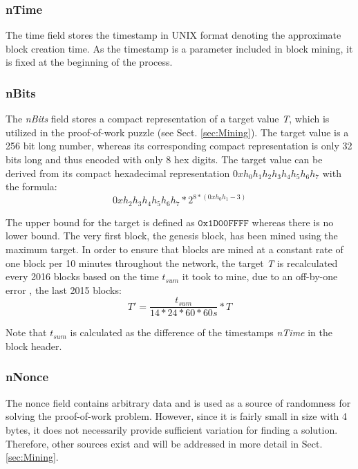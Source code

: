 \subsubsection*{nTime}
The time field stores the timestamp in UNIX format denoting the approximate block creation time. As the timestamp is a parameter included in block mining, it is fixed at the beginning of the process.


\subsubsection*{nBits}
The \textit{nBits} field stores a compact representation of a target value \emph{T}, which is utilized in the proof-of-work puzzle (see Sect. \ref{sec:Mining}). The target value is a 256 bit long number, whereas its corresponding compact representation is only 32 bits long and thus encoded with only 8 hex digits. The target value can be derived from its compact hexadecimal representation $\mathit{0xh_{0}h_{1}h_{2}h_{3}h_{4}h_{5}h_{6}h_{7}}$ with the formula:
\begin{equation}
0xh_{2}h_{3}h_{4}h_{5}h_{6}h_{7} * 2^{8*(0xh_{0}h_{1} - 3)}
\end{equation}


\noindent
The upper bound for the target is defined as $\texttt{0x1D00FFFF}$ whereas there is no lower bound. The very first block, the genesis block, has been mined using the maximum target. In order to ensure that blocks are mined at a constant rate of one block per 10 minutes throughout the network, the target \emph{T} is recalculated every 2016 blocks based on the time $\mathit{t_{sum}}$ it took to mine, due to an off-by-one error \cite{nBitsCalc}, the last 2015 blocks:
\begin{equation}
T' = \dfrac{t_{sum}}{14*24*60*60s}*T
\end{equation}

\noindent
Note that $\mathit{t_{sum}}$ is calculated as the difference of the timestamps \textit{nTime} in the block header.

\subsubsection*{nNonce}
The nonce field contains arbitrary data and is used as a source of randomness for solving the proof-of-work problem. However, since it is fairly small in size with 4 bytes, it does not necessarily provide sufficient variation for finding a solution. Therefore, other sources exist and will be addressed in more detail in Sect. \ref{sec:Mining}.


